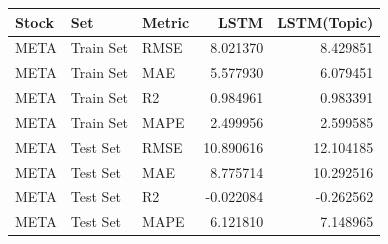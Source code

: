 \begin{tabular}{lllrr}
\toprule
Stock & Set & Metric & LSTM & LSTM(Topic) \\
\midrule
META & Train Set & RMSE & 8.021370 & 8.429851 \\
META & Train Set & MAE & 5.577930 & 6.079451 \\
META & Train Set & R2 & 0.984961 & 0.983391 \\
META & Train Set & MAPE & 2.499956 & 2.599585 \\
META & Test Set & RMSE & 10.890616 & 12.104185 \\
META & Test Set & MAE & 8.775714 & 10.292516 \\
META & Test Set & R2 & -0.022084 & -0.262562 \\
META & Test Set & MAPE & 6.121810 & 7.148965 \\
\bottomrule
\end{tabular}
